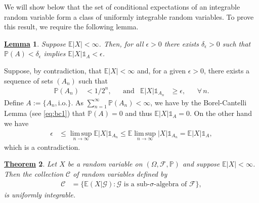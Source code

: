 \documentclass[12pt]{book}
\let\varepsilon\epsilon
\numberwithin{equation}{chapter}
\theoremstyle{plain}
\newtheorem{theorem}{\underline{Theorem}}
\numberwithin{theorem}{section}
\newtheorem{lemma}[theorem]{\underline{Lemma}}   		%
\theoremstyle{definition}
\numberwithin{exercise}{chapter}
\let\oldendproof\endproof
\renewenvironment{proof}[1][\proofname]{%
  \oldproof[\scshape\underline{#1}]%
}{\oldendproof}
\newcommand{\<}{\langle}
\renewcommand{\>}{\rangle}
\renewcommand{\(}{\left(}
\renewcommand{\)}{\right)}
\renewcommand{\[}{\left[}
\renewcommand{\]}{\right]}
\newcommand\Eb{\mathds{E}}
\newcommand\Ib{\mathds{1}} 	%
\newcommand\Pb{\mathds{P}}
\newcommand\Cc{\mathscr{C}}
\newcommand\Fc{\mathscr{F}}
\newcommand\Gc{\mathscr{G}}
\newcommand\eps{\varepsilon}
\newcommand\Om{\Omega}
\newcommand\sig{\sigma}
\newcommand\del{\delta}
\renewcommand\limsup{\operatorname*{lim \, sup}}
\begin{document}
\noindent
We will show below that the set of conditional expectations of an integrable random variable form a class of uniformly integrable random variables.  To prove this result, we require the following lemma.

\begin{lemma}
\label{thm:L1.eps.del}
Suppose $\Eb |X| < \infty$.  Then, for all $\eps > 0$ there exists $\del_\eps > 0$ such that $\Pb(A) < \del_\eps$ implies $\Eb |X|\Ib_A < \eps$.
\end{lemma}

\begin{proof}
Suppose, by contradiction, that $\Eb |X| < \infty$ and, for a given $\eps>0$, there exists a sequence of sets $(A_n)$ such that
\begin{align}
\Pb(A_n) 
	&< 1/2^n , &
	&\text{and}&
\Eb |X|\Ib_{A_n}
	&\geq \eps ,&
	&\forall \, n .
\end{align}
Define $A := \{ A_n, \text{i.o.} \}$.  As $\sum_{n=1}^\infty \Pb(A_n) < \infty$, we have by the Borel-Cantelli Lemma (see \eqref{eq:bc1}) that $\Pb(A) = 0$ and thus $\Eb |X| \Ib_A = 0$.  On the other hand we have
\begin{align}
\eps
	&\leq \limsup_{n \to \infty} \Eb |X| \Ib_{A_n}
	\leq \Eb \limsup_{n \to \infty} |X| \Ib_{A_n}
	=	\Eb |X| \Ib_A ,
\end{align}
which is a contradiction.
\end{proof}

\begin{theorem}
\label{thm:ui.cond.exp}
Let $X$ be a random variable on $(\Om,\Fc,\Pb)$ and suppose $\Eb |X|<\infty$.  Then the collection $\Cc$ of random variables defined by
\begin{align}
\Cc 
	&=	\{ \Eb(X|\Gc) : \text{$\Gc$ is a sub-$\sig$-algebra of $\Fc$} \} ,
\end{align}
is uniformly integrable.
\end{theorem}
\end{document}
